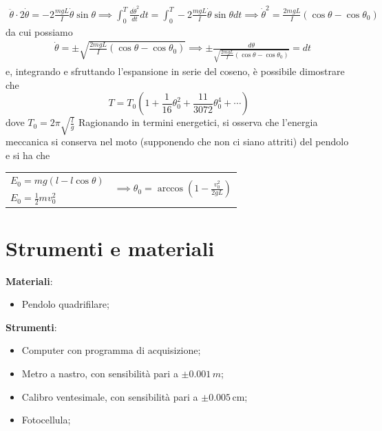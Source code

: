 \documentclass{article}
\begin{document}
	\begin{align*}
		\ddot{\theta} \cdot 2 \dot{\theta} = -2\frac{mgL}{I}\dot{\theta}\sin{\theta} \implies \int_0^T \frac{d\dot{\theta}^2}{dt} dt = \int_0^T -2\frac{mgL}{I}\dot{\theta}\sin{\theta} dt \implies \dot{\theta}^2 = \frac{2mgL}{I}(\cos{\theta} - \cos{\theta_0})
	\end{align*}
	da cui possiamo 
	\begin{align*}
		&\dot{\theta} = \pm \sqrt{\frac{2mgL}{I}(\cos{\theta} - \cos{\theta_0})} \implies \pm \frac{d\theta}{\sqrt{\frac{2mgL}{I}(\cos{\theta} - \cos{\theta_0})} } = dt
	\end{align*}
	e, integrando e sfruttando l'espansione in serie del coseno, è possibile dimostrare che
	\begin{equation*}
		T = T_0 \left( 1 + \frac{1}{16}\theta_0^2 + \frac{11}{3072}\theta_0^4 + \cdots \right)
	\end{equation*}
	dove $T_0 = 2\pi\sqrt{\frac{l}{g}}$
	Ragionando in termini energetici, si osserva che l'energia meccanica si conserva nel moto (supponendo che non ci siano attriti) del pendolo e si ha che
\begin{table}[htbp]
    \centering
    \begin{tabular}{l c}
        $E_0 = mg(l-l\cos{\theta})$ & \multirow{2}{*}{$\implies \theta_0 = \arccos{ \left(1 - \frac{v_0^2}{2gL} \right)}$} \\
         $E_0 = \frac{1}{2}mv_0^2$ &  \\
    \end{tabular}
\end{table}
	\section{Strumenti e materiali}
	\textbf{Materiali}:
	\begin{itemize}
		\item Pendolo quadrifilare;
	\end{itemize}
	\textbf{Strumenti}:
	\begin{itemize}
		\item Computer con programma di acquisizione;
		\item Metro a nastro, con sensibilità pari a $\pm 0.001 \, \si{m}$;
		\item Calibro ventesimale, con sensibilità pari a $\pm 0.005 \, \si{\centi\meter}$;
		\item Fotocellula;
	\end{itemize}
\end{document}
